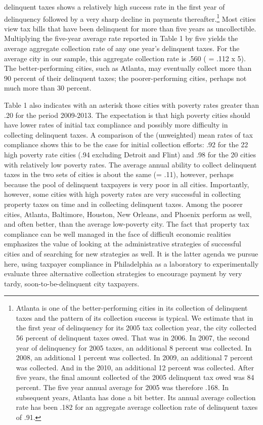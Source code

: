 \documentclass[12pt,titlepage]{article}
\begin{document}
delinquent taxes shows a relatively high success rate in the first
year of delinquency followed by a very sharp decline in payments
thereafter.\footnote{Atlanta is one of the better-performing cities in
  its collection of delinquent taxes and the pattern of its collection
  success is typical.  We estimate that in the first year of
  delinquency for its 2005 tax collection year, the city collected 56
  percent of delinquent taxes owed. That was in 2006.  In 2007, the
  second year of delinquency for 2005 taxes, an additional 8 percent
  was collected.  In 2008, an additional 1 percent was collected.  In
  2009, an additional 7 percent was collected.  And in the 2010, an
  additional 12 percent was collected.  After five years, the final
  amount collected of the 2005 delinquent tax owed was 84 percent.
  The five year annual average for 2005 was therefore .168.  In
  subsequent years, Atlanta has done a bit better.  Its annual average
  collection rate has been .182 for an aggregate average collection
  rate of delinquent taxes of .91.} Most cities view tax bills that
have been delinquent for more than five years as uncollectible.
Multiplying the five-year average rate reported in Table 1 by five
yields the average aggregate collection rate of any one year's
delinquent taxes.  For the average city in our sample, this aggregate
collection rate is .560 ( = .112 x 5).  The better-performing cities,
such as Atlanta, may eventually collect more than 90 percent of their
delinquent taxes; the poorer-performing cities, perhaps not much more
than 30 percent.

Table 1 also indicates with an asterisk those cities with poverty rates greater than
.20 for the period 2009-2013.  The expectation is that high poverty
cities should have lower rates of initial tax compliance and possibly
more difficulty in collecting delinquent taxes.  A comparison of the
(unweighted) mean rates of tax compliance shows this to be the case for initial
collection efforts: .92 for the 22 high poverty rate cities (.94
excluding Detroit and Flint) and .98 for the 20 cities with relatively
low poverty rates.  The average annual ability to collect delinquent
taxes in the two sets of cities is about the same (= .11), however,
perhaps because the pool of delinquent taxpayers is very poor in all
cities.  Importantly, however, some cities with high poverty rates are
very successful in collecting property taxes on time and in collecting
delinquent taxes.  Among the poorer cities, Atlanta, Baltimore,
Houston, New Orleans, and Phoenix perform as well, and often better,
than the average low-poverty city.  The fact that property tax
compliance can be well managed in the face of difficult economic
realities emphasizes the value of looking at the administrative
strategies of successful cities and of searching for new strategies as
well.  It is the latter agenda we pursue here, using taxpayer
compliance in Philadelphia as a laboratory to experimentally evaluate
three alternative collection strategies to encourage payment by very tardy,
soon-to-be-delinquent city taxpayers.
\end{document}
